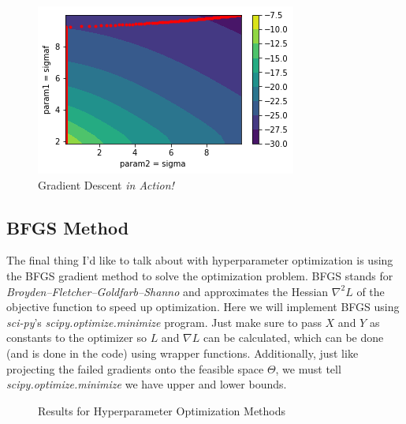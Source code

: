 \documentclass[12pt]{article}
\begin{document}
\begin{figure}
\centering
\includegraphics[]{Post_2_gpresults}
\caption{Gradient Descent \emph{in Action!}}
\end{figure}

\subsection{BFGS Method}

The final thing I'd like to talk about with hyperparameter optimization is using the BFGS gradient method to solve the optimization problem. BFGS stands for \emph{Broyden–Fletcher–Goldfarb–Shanno} and approximates the Hessian $\nabla^2 L$ of the objective function to speed up optimization. Here we will implement BFGS using \emph{sci-py}'s \emph{scipy.optimize.minimize} program. Just make sure to pass $X$ and $Y$ as constants to the optimizer so $L$ and $\nabla L$ can be calculated, which can be done (and is done in the code) using wrapper functions. Additionally, just like projecting the failed gradients onto the feasible space $\Theta$, we must tell \emph{scipy.optimize.minimize} we have upper and lower bounds.

\begin{figure}
\centering
{}
\caption{Results for Hyperparameter Optimization Methods}
\end{figure}
\end{document}

